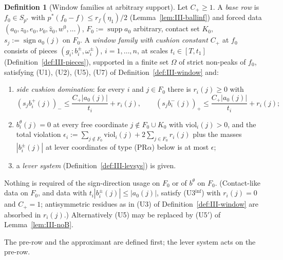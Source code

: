 \documentclass[10pt]{amsart}
\theoremstyle{definition}
\newtheorem{definition}[theorem]{Definition}
\theoremstyle{remark}
\newcommand{\supp}{\operatorname{supp}}
\newcommand{\sgn}{\operatorname{sign}}
\newcommand{\zh}{\hat z}
\begin{document}
\begin{definition}[Window families at arbitrary support]\label{def:III-windowinf}
Let $C_+\ge1$.  A \emph{base row} is $f_0\in S_{p^*}$ with $p^*(f_0-f)\le
r_f(\eta_1)/2$ (Lemma~\ref{lem:III-ballinf}) and forced data
$(a_0,z_0,e_0,\nu_0,\zh_0,w^0,\dots)$, $F_0:=\supp a_0$ arbitrary, contact set
$K_0$, $s_j:=\sgn a_0(j)$ on $F_0$.  A \emph{window family with cushion
constant $C_+$} at $f_0$ consists of pieces $(g_i;b^\pm_i,\omega^\pm_i)$,
$i=1,\dots,n$, at scales $t_i\in[T,t_1]$ (Definition~\ref{def:III-pieces}),
supported in a finite set $\Omega$ of strict non-peaks of $f_0$, satisfying
\textup{(U1)}, \textup{(U2)}, \textup{(U5)}, \textup{(U7)} of
Definition~\ref{def:III-window} and:
\begin{enumerate}
\item[(U3$^{\inf}$)] \emph{side cushion domination}: for every $i$ and
$j\in F_0$ there is $r_i(j)\ge0$ with
\[
 (s_jb^+_i(j))_-\le\frac{C_+|a_0(j)|}{t_i}+r_i(j),\qquad
 (s_jb^-_i(j))_+\le\frac{C_+|a_0(j)|}{t_i}+r_i(j);
\]
\item[(U4$^{\inf}$)] $b^\theta_i(j)=0$ at every free coordinate $j\notin
F_0\cup K_0$ with $\mathrm{viol}_i(j)>0$, and the total violation
$\epsilon_i:=\sum_{j\notin F_0}\mathrm{viol}_i(j)+2\sum_{j\in F_0}r_i(j)$ plus
the masses $|b^\pm_i(j)|$ at lever coordinates of type \textup{(PR$\alpha$)}
below is at most $\epsilon$;
\item[(U6$^{\inf}$)] a \emph{lever system} (Definition~\ref{def:III-levsys}) is
given.
\end{enumerate}
Nothing is required of the sign-direction usage on $F_0$ or of $b^\theta$ on
$F_0$.  (Contact-like data on $F_0$, and data with $t_i|b^\pm_i(j)|\le
|a_0(j)|$, satisfy (U3$^{\inf}$) with $r_i(j)=0$ and $C_+=1$; antisymmetric
residues as in (U3) of Definition~\ref{def:III-window} are absorbed in
$r_i(j)$.)  Alternatively (U5) may be replaced by (U5$'$) of
Lemma~\ref{lem:III-noB}.
\end{definition}

The pre-row and the approximant are defined first; the lever system acts on
the pre-row.
\end{document}
